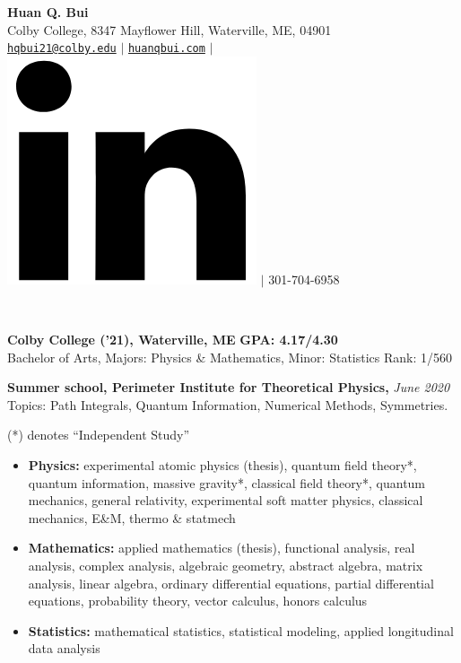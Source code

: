 \documentclass[letter, 10pt]{article}
\newcommand{\longunderline}[1]{\uline{#1\hfill\mbox{}}}
\begin{document}
	\begin{center}
		{\LARGE\textbf{Huan Q. Bui}}\\
		\smallskip
		Colby College, 8347 Mayflower Hill, Waterville, ME, 04901\\ \href{mailto:hqbui21@colby.edu}{\texttt{hqbui21@colby.edu}} $\vert$ \href{https://huanqbui.com}{\texttt{huanqbui.com}} $\vert$ \href{https://www.linkedin.com/in/huan-bui/}{\includegraphics[scale=0.04]{linkedin_logo.PNG}} $\vert$ 301-704-6958
	\end{center}
	\noindent \longunderline{\normalsize{{}}}\\
	\vspace{-7pt}
	
	
			\noindent \textbf{Colby College ('21), Waterville, ME} \hfill \textbf{GPA: 4.17/4.30}\\
			Bachelor of Arts, {Majors}: Physics \& Mathematics, {Minor}: Statistics \hfill Rank: 1/560\\
			\vspace{-7pt}
			
			
			\noindent \textbf{Summer school, Perimeter Institute for Theoretical Physics,} \textit{June 2020}\\
			\noindent Topics: Path Integrals, Quantum Information, Numerical Methods, Symmetries.\\
			\vspace{-7pt}

			 (*) denotes ``Independent Study''
			\begin{itemize}[noitemsep, nolistsep]
				\item \textbf{Physics:} experimental atomic physics (thesis), quantum field theory*, quantum information, massive gravity*, classical field theory*, quantum mechanics,  general relativity, experimental soft matter physics, classical mechanics, E\&M, thermo \& statmech
				\item \textbf{Mathematics:} applied mathematics (thesis), functional analysis, real analysis, complex analysis, algebraic geometry, abstract algebra, matrix analysis, linear algebra, ordinary differential equations, partial differential equations, probability theory, vector calculus, honors calculus
				\item \textbf{Statistics:}  mathematical statistics,  statistical modeling, applied longitudinal data analysis\\
			\end{itemize}
 
\end{document}
